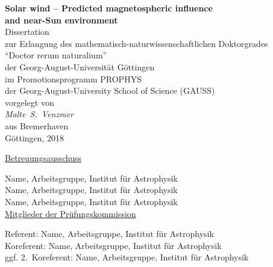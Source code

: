 
\begin{titlepage}
	\begin{center}
		\vspace*{\fill}
		\renewcommand{\baselinestretch}{1.5}
		{\LARGE\sffamily
			\textbf{Solar wind -- Predicted magnetospheric influence\\and near-Sun environment}\\
		}
		\Large\rmfamily
		\vspace{3\baselineskip}
		Dissertation\\
		zur Erlangung des mathematisch-naturwissenschaftlichen Doktorgrades\\
		``Doctor rerum naturalium''\\
		der Georg-August-Universität Göttingen\\
		\vspace{\baselineskip}
		im Promotionsprogramm PROPHYS\\
		der Georg-August-University School of Science (GAUSS)\\
		\vspace{4\baselineskip}
		vorgelegt von\\
		{\textit{%
			Malte~S.~Venzmer\\
		}}
		aus Bremerhaven\\
		\vspace{4\baselineskip}
		Göttingen, 2018
		\vspace{\baselineskip}
		\vspace{\fill}
	\end{center}
\end{titlepage}

\newpage

\noindent \underline{Betreuungsausschuss}
\vspace{\baselineskip}

\noindent Name, Arbeitsgruppe, Institut für Astrophysik
\vspace{\baselineskip}\\
Name, Arbeitsgruppe, Institut für Astrophysik
\vspace{\baselineskip}\\
Name, Arbeitsgruppe, Institut für Astrophysik
\vspace{2\baselineskip}\\

\noindent \underline{Mitglieder der Prüfungskommission}
\vspace{\baselineskip}

\noindent Referent: Name, Arbeitsgruppe, Institut für Astrophysik
\vspace{\baselineskip}\\
Koreferent: Name, Arbeitsgruppe, Institut für Astrophysik
\vspace{\baselineskip}\\
ggf. 2.~Koreferent: Name, Arbeitsgruppe, Institut für Astrophysik
\vspace{2\baselineskip}\\

